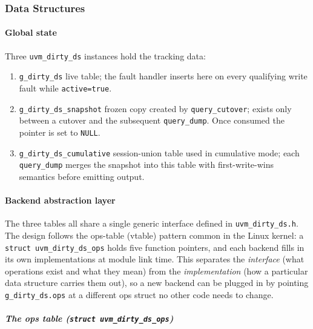 \subsubsection*{Data Structures}

\paragraph{Global state}
Three \texttt{uvm\_dirty\_ds} instances hold the tracking data:
\begin{enumerate}
      \item \texttt{g\_dirty\_ds} live table; the fault handler inserts here
            on every qualifying write fault while \texttt{active=true}.
      \item \texttt{g\_dirty\_ds\_snapshot} frozen copy created by
            \texttt{query\_cutover}; exists only between a cutover and the
            subsequent \texttt{query\_dump}.  Once consumed the pointer is
            set to \texttt{NULL}.
      \item \texttt{g\_dirty\_ds\_cumulative} session-union table used in
            cumulative mode; each \texttt{query\_dump} merges the snapshot
            into this table with first-write-wins semantics before emitting output.
\end{enumerate}

\paragraph{Backend abstraction layer}

The three tables all share a single generic interface defined in
\texttt{uvm\_dirty\_ds.h}.
The design follows the ops-table (vtable) pattern common in the Linux kernel:
a \texttt{struct uvm\_dirty\_ds\_ops} holds five function pointers, and each
backend fills in its own implementations at module link time.
This separates the \emph{interface} (what operations exist and what they mean)
from the \emph{implementation} (how a particular data structure carries them
out), so a new backend can be plugged in by pointing \texttt{g\_dirty\_ds.ops}
at a different ops struct no other code needs to change.

\subparagraph{The ops table (\texttt{struct uvm\_dirty\_ds\_ops})}

